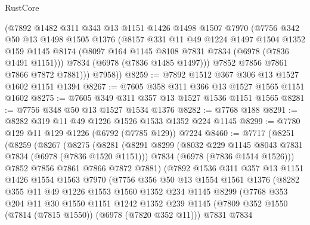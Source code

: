\begin{lexlean}{RustCore}
\begin{coremodule}
          (@7892
            @1482
            @311
            @343
            @13
            @1151
            @1426
            @1498
            @1507
            @7970
            (@7756
              @342
              @50
              @13
              @1498
              @1505
              @1376
              (@8157
                @331
                @11
                @49
                @1224
                @1497
                @1504
                @1352
                @159
                @1145
                @8174
                (@8097 @164 @1145 @8108 @7831 @7834 (@6978 (@7836 @1491 @1151)))
                @7834
                (@6978 (@7836 @1485 @1497)))
              @7852
              @7856
              @7861
              @7866
              @7872
              @7881)))
        @7958))
@8259 := @7892 @1512 @367 @306 @13 @1527 @1602 @1151 @1394
@8267 := @7605 @358 @311 @366 @13 @1527 @1565 @1151 @1602
@8275 := @7605 @349 @311 @357 @13 @1527 @1536 @1151 @1565
@8281 := @7756 @348 @50 @13 @1527 @1534 @1376
@8282 := @7768 @188
@8291 := @8282 @319 @11 @49 @1226 @1526 @1533 @1352 @224 @1145
@8299 := @7780 @129 @11 @129 @1226 (@6792 (@7785 @129)) @7224
@8460 := @7717
    (@8251
      (@8259
        (@8267
          (@8275
            (@8281
              (@8291
                @8299
                (@8032 @229 @1145 @8043 @7831 @7834 (@6978 (@7836 @1520 @1151)))
                @7834
                (@6978 (@7836 @1514 @1526)))
              @7852
              @7856
              @7861
              @7866
              @7872
              @7881)
            (@7892
              @1536
              @311
              @357
              @13
              @1151
              @1426
              @1554
              @1563
              @7970
              (@7756
                @356
                @50
                @13
                @1554
                @1561
                @1376
                (@8282
                  @355
                  @11
                  @49
                  @1226
                  @1553
                  @1560
                  @1352
                  @234
                  @1145
                  @8299
                  (@7768
                    @353
                    @204
                    @11
                    @30
                    @1550
                    @1151
                    @1242
                    @1352
                    @239
                    @1145
                    (@7809 @352 @1550 (@7814 (@7815 @1550)) (@6978 (@7820 @352 @11)))
                    @7831
                    @7834

\end{coremodule}
\end{lexlean}
